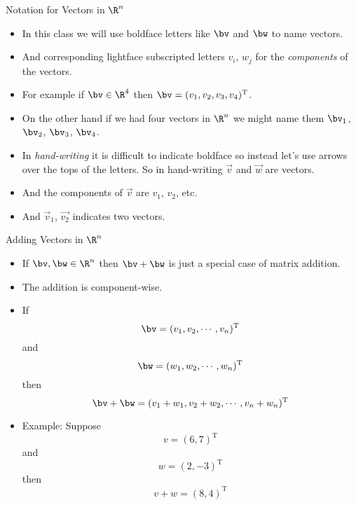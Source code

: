 \documentclass{beamer}
\begin{document}
\begin{frame}{Notation for Vectors in $\R^n$}

\begin{itemize}
\item In this class we will use boldface letters like $\bv$ and $\bw$ to name
vectors.
\item And corresponding lightface subscripted letters $v_i$, $w_j$ for the
\emph{components} of the vectors.
\item For example if $\bv\in\R^4$ then $\bv=(v_1, v_2, v_3, v_4)^{\text{T}}$.
\item On the other hand if we had four vectors in $\R^n$ we might name them
$\bv_1$, $\bv_2$, $\bv_3$, $\bv_4$.
\item In \emph{hand-writing} it is difficult to indicate boldface so instead
let's use arrows over the tops of the letters. So in hand-writing
$\vec{v}$ and $\vec{w}$ are vectors.
\item And the components of $\vec{v}$ are $v_1$, $v_2$, etc.
\item And $\vec{v}_1$, $\vec{v_2}$ indicates two vectors.
\end{itemize}

\end{frame}

\begin{frame}{Adding Vectors in $\R^n$}

\begin{itemize}
\item If $\bv, \bw \in \R^n$ then $\bv+\bw$ is just a special case of matrix addition.
\item The addition is component-wise.
\item If $$\bv=(v_1, v_2, \cdots , v_n)^{\text{T}}$$ and $$\bw=(w_1, w_2, \cdots, w_n)^{\text{T}}$$
then $$\bv+\bw = (v_1 + w_1, v_2 + w_2, \cdots, v_n + w_n)^{\text{T}}$$
\item Example: Suppose $$v = (6, 7)^{\text{T}}$$ and $$w=(2, -3)^{\text{T}}$$ then
$$v+w=(8, 4)^{\text{T}}$$
\end{itemize}

\end{frame}

\beamerdefaultoverlayspecification{}
\end{document}
